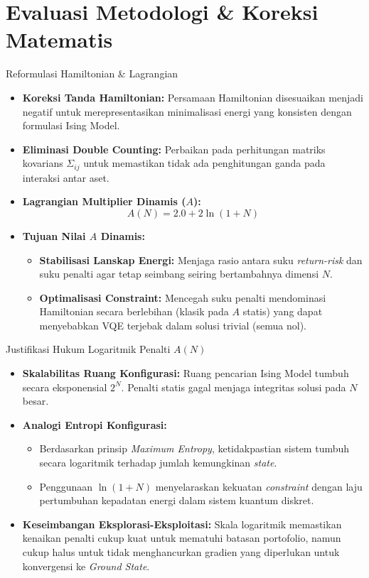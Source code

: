 \section{Evaluasi Metodologi \& Koreksi Matematis}

\begin{frame}{Reformulasi Hamiltonian \& Lagrangian}
    \begin{itemize}
        \item \textbf{Koreksi Tanda Hamiltonian:} Persamaan Hamiltonian disesuaikan menjadi negatif untuk merepresentasikan minimalisasi energi yang konsisten dengan formulasi Ising Model.
        \item \textbf{Eliminasi Double Counting:} Perbaikan pada perhitungan matriks kovarians $\Sigma_{ij}$ untuk memastikan tidak ada penghitungan ganda pada interaksi antar aset.
        \item \textbf{Lagrangian Multiplier Dinamis ($A$):}
        \begin{equation}
            A(N) = 2.0 + 2 \ln(1 + N)
        \end{equation}
        \item \textbf{Tujuan Nilai $A$ Dinamis:}
        \begin{itemize}
            \item \textbf{Stabilisasi Lanskap Energi:} Menjaga rasio antara suku \textit{return-risk} dan suku penalti agar tetap seimbang seiring bertambahnya dimensi $N$.
            \item \textbf{Optimalisasi Constraint:} Mencegah suku penalti mendominasi Hamiltonian secara berlebihan (klasik pada $A$ statis) yang dapat menyebabkan VQE terjebak dalam solusi trivial (semua nol).
        \end{itemize}
    \end{itemize}
\end{frame}

\begin{frame}{Justifikasi Hukum Logaritmik Penalti $A(N)$}
    \begin{itemize}
        \item \textbf{Skalabilitas Ruang Konfigurasi:} Ruang pencarian Ising Model tumbuh secara eksponensial $2^N$. Penalti statis gagal menjaga integritas solusi pada $N$ besar.
        \item \textbf{Analogi Entropi Konfigurasi:}
        \begin{itemize}
            \item Berdasarkan prinsip \textit{Maximum Entropy}, ketidakpastian sistem tumbuh secara logaritmik terhadap jumlah kemungkinan \textit{state}.
            \item Penggunaan $\ln(1+N)$ menyelaraskan kekuatan \textit{constraint} dengan laju pertumbuhan kepadatan energi dalam sistem kuantum diskret.
        \end{itemize}
        \item \textbf{Keseimbangan Eksplorasi-Eksploitasi:} Skala logaritmik memastikan kenaikan penalti cukup kuat untuk mematuhi batasan portofolio, namun cukup halus untuk tidak menghancurkan gradien yang diperlukan untuk konvergensi ke \textit{Ground State}.
    \end{itemize}
\end{frame}

